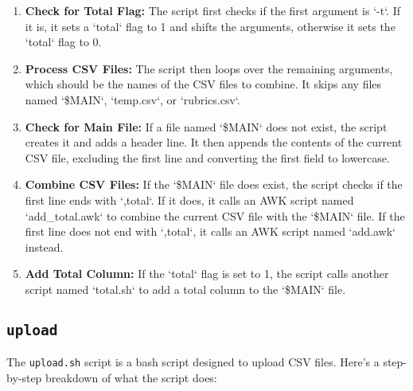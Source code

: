 \documentclass{article}
\begin{document}
\begin{enumerate}
    \item \textbf{Check for Total Flag:} The script first checks if the first argument is `-t`. If it is, it sets a `total` flag to 1 and shifts the arguments, otherwise it sets the `total` flag to 0.
    
    \item \textbf{Process CSV Files:} The script then loops over the remaining arguments, which should be the names of the CSV files to combine. It skips any files named `\$MAIN`, `temp.csv`, or `rubrics.csv`.
    
    \item \textbf{Check for Main File:} If a file named `\$MAIN` does not exist, the script creates it and adds a header line. It then appends the contents of the current CSV file, excluding the first line and converting the first field to lowercase.
    
    \item \textbf{Combine CSV Files:} If the `\$MAIN` file does exist, the script checks if the first line ends with `,total`. If it does, it calls an AWK script named `add\_total.awk` to combine the current CSV file with the `\$MAIN` file. If the first line does not end with `,total`, it calls an AWK script named `add.awk` instead.
    
    \item \textbf{Add Total Column:} If the `total` flag is set to 1, the script calls another script named `total.sh` to add a total column to the `\$MAIN` file.
\end{enumerate}

\subsection{\texttt{upload}}
The \texttt{upload.sh} script is a bash script designed to upload CSV files. Here's a step-by-step breakdown of what the script does:
\end{document}
